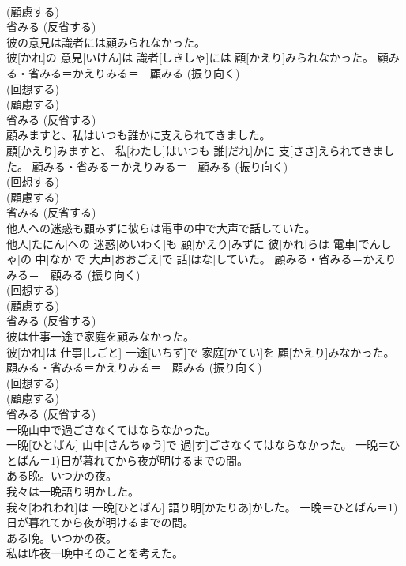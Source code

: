 \documentclass[8pt]{extreport}
\begin{document}
\begin{CJK}{UTF8}{min}
{\\	(顧慮する) 
\\	{省みる} (反省する) 
\\	彼の意見は識者には顧みられなかった。	
\\	彼[かれ]の 意見[いけん]は 識者[しきしゃ]には 顧[かえり]みられなかった。	顧みる・省みる＝かえりみる＝　{顧みる} (振り向く) 
\\	(回想する) 
\\	(顧慮する) 
\\	{省みる} (反省する) 
\\	顧みますと、私はいつも誰かに支えられてきました。	
\\	顧[かえり]みますと、 私[わたし]はいつも 誰[だれ]かに 支[ささ]えられてきました。	顧みる・省みる＝かえりみる＝　{顧みる} (振り向く) 
\\	(回想する) 
\\	(顧慮する) 
\\	{省みる} (反省する) 
\\	他人への迷惑も顧みずに彼らは電車の中で大声で話していた。	
\\	他人[たにん]への 迷惑[めいわく]も 顧[かえり]みずに 彼[かれ]らは 電車[でんしゃ]の 中[なか]で 大声[おおごえ]で 話[はな]していた。	顧みる・省みる＝かえりみる＝　{顧みる} (振り向く) 
\\	(回想する) 
\\	(顧慮する) 
\\	{省みる} (反省する) 
\\	彼は仕事一途で家庭を顧みなかった。	
\\	彼[かれ]は 仕事[しごと] 一途[いちず]で 家庭[かてい]を 顧[かえり]みなかった。	顧みる・省みる＝かえりみる＝　{顧みる} (振り向く) 
\\	(回想する) 
\\	(顧慮する) 
\\	{省みる} (反省する) 
\\	一晩山中で過ごさなくてはならなかった。	
\\	一晩[ひとばん] 山中[さんちゅう]で 過[す]ごさなくてはならなかった。	一晩＝ひとばん＝1)日が暮れてから夜が明けるまでの間。 　　　　　　　　
\\	ある晩。いつかの夜。
\\	我々は一晩語り明かした。	
\\	我々[われわれ]は 一晩[ひとばん] 語り明[かたりあ]かした。	一晩＝ひとばん＝1)日が暮れてから夜が明けるまでの間。 　　　　　　　　
\\	ある晩。いつかの夜。
\\	私は昨夜一晩中そのことを考えた。	
}
\end{CJK}
\end{document}
